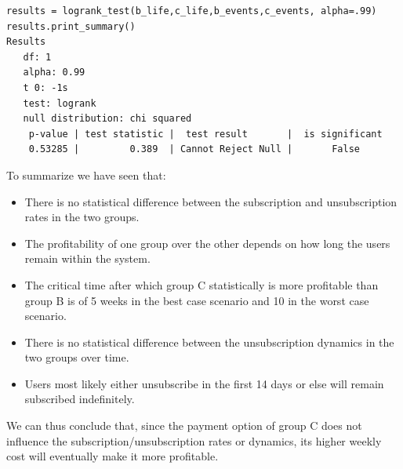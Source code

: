\documentclass[paper=a4, fontsize=10pt]{report}
\begin{document}
\scriptsize
\begin{lstlisting}[frame=single,caption=LogRank test \label{code:python_logRank}]
results = logrank_test(b_life,c_life,b_events,c_events, alpha=.99)
results.print_summary()
Results
   df: 1
   alpha: 0.99
   t 0: -1s
   test: logrank
   null distribution: chi squared
    p-value | test statistic |  test result       |  is significant
    0.53285 |         0.389  | Cannot Reject Null |       False       

\end{lstlisting}



\normalsize
To summarize we have seen that:
\begin{itemize}
 \item There is no statistical difference between the subscription and unsubscription rates in the two groups.
 \item The profitability of one group over the other depends on how long the users remain within the system.
 \item The critical time after which group C statistically is more profitable than group B is of 5 weeks in the best case scenario and
 10 in the worst case scenario.
  \item There is no statistical difference between the unsubscription dynamics in the two groups over time.
 \item Users most likely either unsubscribe in the first 14 days or else will remain subscribed indefinitely.
\end{itemize}

We can thus conclude that, since the payment option of group C does not influence the subscription/unsubscription rates or dynamics, its
higher weekly cost will eventually make it more profitable. 
\end{document}

